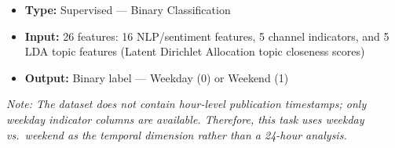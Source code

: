 \begin{itemize}[leftmargin=1.5em]
    \item \textbf{Type:} Supervised --- Binary Classification
    \item \textbf{Input:} 26 features: 16 NLP/sentiment features, 5 channel indicators, and 5 LDA topic features (Latent Dirichlet Allocation topic closeness scores)
    \item \textbf{Output:} Binary label --- Weekday (0) or Weekend (1)
\end{itemize}

\noindent\textit{Note: The dataset does not contain hour-level publication timestamps; only weekday indicator columns are available. Therefore, this task uses weekday vs.\ weekend as the temporal dimension rather than a 24-hour analysis.}
